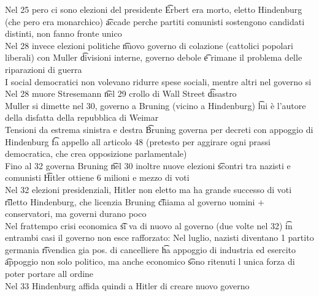 \documentclass[12pt]{article}
\begin{document}
Nel 25 pero ci sono elezioni del presidente \t Erbert era morto, eletto Hindenburg (che pero era monarchico) \t accade perche partiti comunisti sostengono candidati distinti, non fanno fronte unico \\
Nel 28 invece elezioni politiche \t nuovo governo di colazione (cattolici popolari liberali) con Muller \t divisioni interne, governo debole \t e rimane il problema delle riparazioni di guerra \\
I social democratici non volevano ridurre spese sociali, mentre altri nel governo si \\
Nel 28 muore Stresemann \t nel 29 crollo di Wall Street \t disastro \\
Muller si dimette nel 30, governo a Bruning (vicino a Hindenburg) \t lui è l'autore della disfatta della repubblica di Weimar \\
Tensioni da estrema sinistra e destra \t Bruning governa per decreti con appoggio di Hindenburg \t fa appello all articolo 48 (pretesto per aggirare ogni prassi democratica, che crea opposizione parlamentale) \\
Fino al 32 governa Bruning \t nel 30 inoltre nuove elezioni \t scontri tra nazisti e comunisti \t Hitler ottiene 6 milioni e mezzo di voti \\
Nel 32 elezioni presidenziali, Hitler non eletto ma ha grande successo di voti \t riletto Hindenburg, che licenzia Bruning \t chiama al governo uomini + conservatori, ma governi durano poco \\
Nel frattempo crisi economica \t si va di nuovo al governo (due volte nel 32) \t in entrambi casi il governo non esce rafforzato:
Nel luglio, nazisti diventano 1 partito germania \t rivendica gia pos. di cancelliere \t ha appoggio di industria ed esercito \t appoggio non solo politico, ma anche economico \t sono ritenuti l unica forza di poter portare all ordine \\
Nel 33 Hindenburg affida quindi a Hitler di creare nuovo governo
\end{document}

